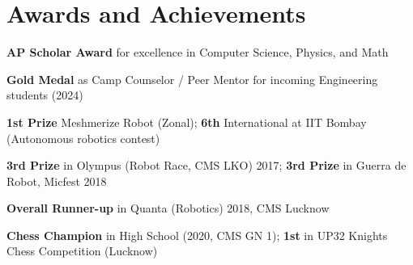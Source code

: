 \documentclass[letterpaper,10pt]{article}
\begin{document}
\section{Awards and Achievements}
\begin{itemize}[leftmargin=0.25in,label=\textbullet]
  \small{
    \item \textbf{AP Scholar Award} for excellence in Computer Science, Physics, and Math
    \item \textbf{Gold Medal} as Camp Counselor / Peer Mentor for incoming Engineering students (2024)
    \item \textbf{1st Prize} Meshmerize Robot (Zonal); \textbf{6th} International at IIT Bombay (Autonomous robotics contest)
    \item \textbf{3rd Prize} in Olympus (Robot Race, CMS LKO) 2017; \textbf{3rd Prize} in Guerra de Robot, Micfest 2018
    \item \textbf{Overall Runner-up} in Quanta (Robotics) 2018, CMS Lucknow
    \item \textbf{Chess Champion} in High School (2020, CMS GN 1); \textbf{1st} in UP32 Knights Chess Competition (Lucknow)
  }
\end{itemize}
\end{document}
